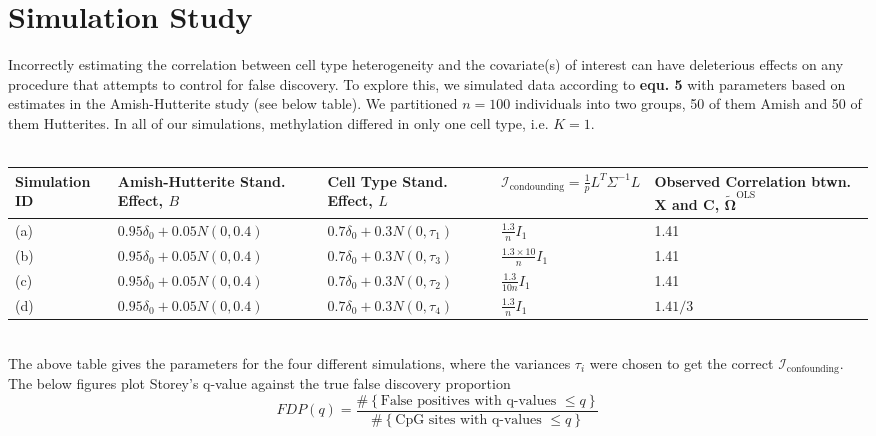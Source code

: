 \documentclass{article}
\begin{document}
\section{Simulation Study}
\indent Incorrectly estimating the correlation between cell type heterogeneity and the covariate(s) of interest can have deleterious effects on any procedure that attempts to control for false discovery. To explore this, we simulated data according to \textbf{equ. 5} with parameters based on estimates in the Amish-Hutterite study (see below table). We partitioned $n = 100$ individuals into two groups, 50 of them Amish and 50 of them Hutterites. In all of our simulations, methylation differed in only one cell type, i.e. $K=1$.\\
\\
\begin{tabular}{|p{2.0cm}||p{3.1cm}|p{2.8cm}|p{2.0cm}|p{3.5cm}|}
\hline
Simulation ID & Amish-Hutterite Stand. Effect, $B$ & Cell Type Stand. Effect, $L$ & $\mathcal{I}_{\text{condounding}} = \frac{1}{p}L^T \Sigma^{-1}L$ & Observed Correlation btwn. $\bm{X}$ and $\bm{C}$, $\tilde{\bm{\Omega}}^{\text{OLS}}$\\\hline
(a) & $0.95\delta_0 + 0.05N\left( 0,0.4 \right)$ & $0.7\delta_0 + 0.3N\left( 0, \tau_1 \right)$ & $\frac{1.3}{n}I_1$ & 1.41\\\hline
(b) & $0.95\delta_0 + 0.05N\left( 0,0.4 \right)$ & $0.7\delta_0 + 0.3N\left( 0, \tau_3 \right)$ & $\frac{1.3 \times 10}{n}I_1$ & 1.41 \\\hline
(c) & $0.95\delta_0 + 0.05N\left( 0,0.4 \right)$ & $0.7\delta_0 + 0.3N\left( 0, \tau_2 \right)$ & $\frac{1.3}{10n}I_1$ & 1.41 \\\hline
(d) & $0.95\delta_0 + 0.05N\left( 0,0.4 \right)$ & $0.7\delta_0 + 0.3N\left( 0, \tau_4 \right)$ & $\frac{1.3}{n}I_1$ & $1.41/3$\\\hline

\end{tabular}\\
The above table gives the parameters for the four different simulations, where the variances $\tau_i$ were chosen to get the correct $\mathcal{I}_{\text{confounding}}$. The below figures plot Storey's q-value against the true false discovery proportion
\begin{equation}
FDP(q) = \frac{\#\left\lbrace \text{False positives with q-values $\leq q$} \right\rbrace}{\#\left\lbrace \text{CpG sites with q-values $\leq q$} \right\rbrace}
\end{equation}
\\
\end{document}

